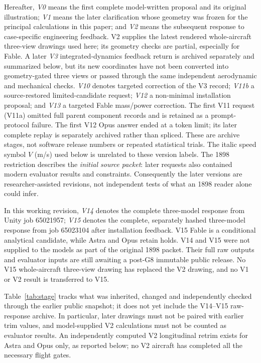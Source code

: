 \documentclass[11pt,a4paper]{article}
\begin{document}
Hereafter, \emph{V0} means the first complete model-written proposal and its original illustration; \emph{V1} means the later clarification whose geometry was frozen for the principal calculations in this paper; and \emph{V2} means the subsequent response to case-specific engineering feedback. V2 supplies the latest rendered whole-aircraft three-view drawings used here; its geometry checks are partial, especially for Fable. A later \emph{V3} integrated-dynamics feedback return is archived separately and summarized below, but its new coordinates have not been converted into geometry-gated three views or passed through the same independent aerodynamic and mechanical checks. \emph{V10} denotes targeted correction of the V3 record; \emph{V11b} a source-restored limited-candidate request; \emph{V12} a non-minimal installation proposal; and \emph{V13} a targeted Fable mass/power correction. The first V11 request (V11a) omitted full parent component records and is retained as a prompt-protocol failure. The first V12 Opus answer ended at a token limit; its later complete replay is separately archived rather than spliced. These are archive stages, not software release numbers or repeated statistical trials. The italic speed symbol $V$ (m/s) used below is unrelated to these version labels. The 1898 restriction describes the \emph{initial source packet}: later requests also contained modern evaluator results and constraints. Consequently the later versions are researcher-assisted revisions, not independent tests of what an 1898 reader alone could infer.

In this working revision, \emph{V14} denotes the complete three-model response from Unity job 65021957; \emph{V15} denotes the complete, separately hashed three-model response from job 65023104 after installation feedback. V15 Fable is a conditional analytical candidate, while Astra and Opus retain holds. V14 and V15 were not supplied to the models as part of the original 1898 packet. Their full raw outputs and evaluator inputs are still awaiting a post-G8 immutable public release. No V15 whole-aircraft three-view drawing has replaced the V2 drawing, and no V1 or V2 result is transferred to V15.

Table~\ref{tab:stage} tracks what was inherited, changed and independently checked through the earlier public snapshot; it does not yet include the V14--V15 raw-response archive. In particular, later drawings must not be paired with earlier trim values, and model-supplied V2 calculations must not be counted as evaluator results. An independently computed V2 longitudinal retrim exists for Astra and Opus only, as reported below; no V2 aircraft has completed all the necessary flight gates.
\end{document}
